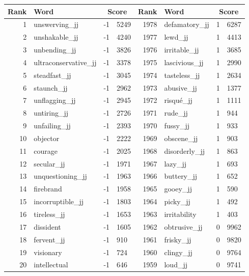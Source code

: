 \begin{table}[tbp]
    \begin{tabular}{| rlr@{.}l | rlr@{.}l |}
    \hline
    \textbf{Rank} & \textbf{Word} & \multicolumn{2}{c|}{\textbf{Score}} & \textbf{Rank} & \textbf{Word} & \multicolumn{2}{c|}{\textbf{Score}} \\
    \hline
    1 & unswerving\_jj & -1 & 5249    &    1978 & defamatory\_jj & 1 & 6287 \\
    2 & unshakable\_jj & -1 & 4240    &    1977 & lewd\_jj & 1 & 4413 \\
    3 & unbending\_jj & -1 & 3826    &    1976 & irritable\_jj & 1 & 3685 \\
    4 & ultraconservative\_jj & -1 & 3378    &    1975 & lascivious\_jj & 1 & 2990 \\
    5 & steadfast\_jj & -1 & 3045    &    1974 & tasteless\_jj & 1 & 2634 \\
    6 & staunch\_jj & -1 & 2962    &    1973 & abusive\_jj & 1 & 1377 \\
    7 & unflagging\_jj & -1 & 2945    &    1972 & risqué\_jj & 1 & 1111 \\
    8 & untiring\_jj & -1 & 2726    &    1971 & rude\_jj & 1 & 944 \\
    9 & unfailing\_jj & -1 & 2393    &    1970 & fussy\_jj & 1 & 933 \\
    10 & objector & -1 & 2222    &    1969 & obscene\_jj & 1 & 903 \\
    11 & courage & -1 & 2025    &    1968 & disorderly\_jj & 1 & 863 \\
    12 & secular\_jj & -1 & 1971    &    1967 & lazy\_jj & 1 & 693 \\
    13 & unquestioning\_jj & -1 & 1963    &    1966 & buttery\_jj & 1 & 652 \\
    14 & firebrand & -1 & 1958    &    1965 & gooey\_jj & 1 & 590 \\
    15 & incorruptible\_jj & -1 & 1803    &    1964 & picky\_jj & 1 & 492 \\
    16 & tireless\_jj & -1 & 1653    &    1963 & irritability & 1 & 403 \\
    17 & dissident & -1 & 1605    &    1962 & obtrusive\_jj & 0 & 9962 \\
    18 & fervent\_jj & -1 & 910    &    1961 & frisky\_jj & 0 & 9820 \\
    19 & visionary & -1 & 724    &    1960 & clingy\_jj & 0 & 9764 \\
    20 & intellectual & -1 & 646    &    1959 & loud\_jj & 0 & 9741 \\

\end{tabular}
\end{table}

